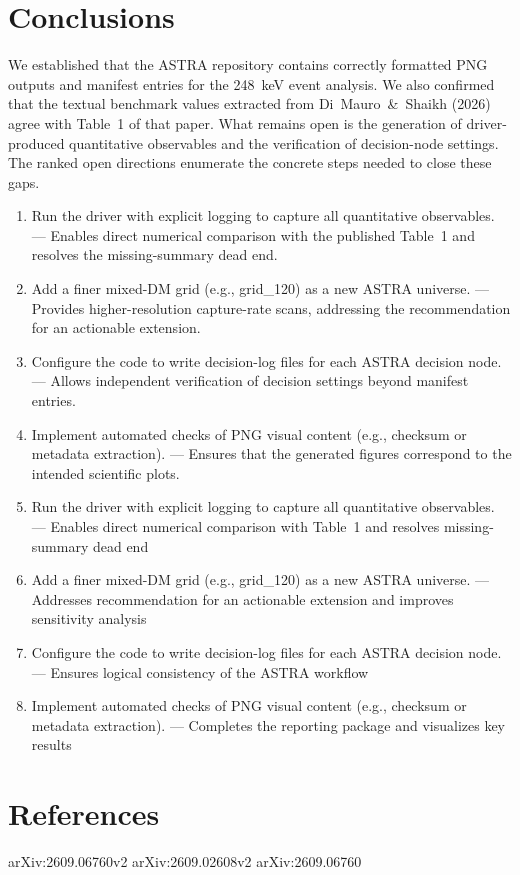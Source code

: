 \documentclass[11pt,a4paper]{article}
\begin{document}
\section{Conclusions}
We established that the ASTRA repository contains correctly formatted PNG outputs and manifest entries for the 248~keV event analysis. We also confirmed that the textual benchmark values extracted from Di~Mauro~\&~Shaikh (2026) agree with Table~1 of that paper. What remains open is the generation of driver-produced quantitative observables and the verification of decision-node settings. The ranked open directions enumerate the concrete steps needed to close these gaps.

\begin{enumerate}
  \item Run the driver with explicit logging to capture all quantitative observables. --- Enables direct numerical comparison with the published Table~1 and resolves the missing-summary dead end.
  \item Add a finer mixed-DM grid (e.g., grid\_120) as a new ASTRA universe. --- Provides higher-resolution capture-rate scans, addressing the recommendation for an actionable extension.
  \item Configure the code to write decision-log files for each ASTRA decision node. --- Allows independent verification of decision settings beyond manifest entries.
  \item Implement automated checks of PNG visual content (e.g., checksum or metadata extraction). --- Ensures that the generated figures correspond to the intended scientific plots.
  \item Run the driver with explicit logging to capture all quantitative observables. --- Enables direct numerical comparison with Table~1 and resolves missing-summary dead end
  \item Add a finer mixed-DM grid (e.g., grid\_120) as a new ASTRA universe. --- Addresses recommendation for an actionable extension and improves sensitivity analysis
  \item Configure the code to write decision-log files for each ASTRA decision node. --- Ensures logical consistency of the ASTRA workflow
  \item Implement automated checks of PNG visual content (e.g., checksum or metadata extraction). --- Completes the reporting package and visualizes key results
\end{enumerate}
\section*{References}
arXiv:2609.06760v2 arXiv:2609.02608v2 arXiv:2609.06760
\end{document}

